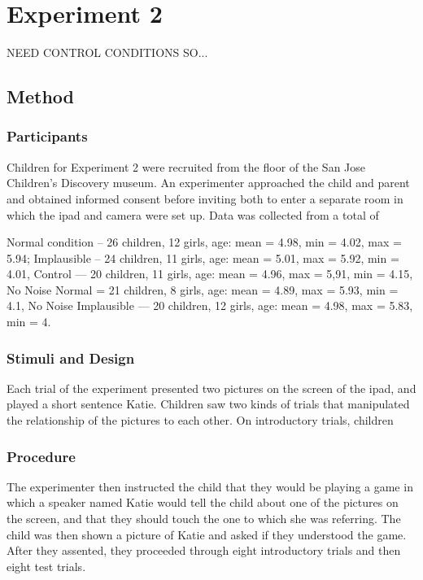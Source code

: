 \documentclass[man,floatsintext]{apa6}
\begin{document}
\section{Experiment 2}

NEED CONTROL CONDITIONS SO...

\subsection{Method}

\subsubsection{Participants}

Children for Experiment 2 were recruited from the floor of the San Jose Children's Discovery museum. An experimenter approached the child and parent and obtained informed consent before inviting both to enter a separate room in which the ipad and camera were set up. Data was collected from a total of 

 Normal condition -- 26 children, 12 girls, age: mean = 4.98, min = 4.02, max = 5.94; Implausible -- 24 children, 11 girls, age: mean = 5.01, max = 5.92, min = 4.01, Control --- 20 children, 11 girls, age: mean = 4.96, max = 5,91, min = 4.15, No Noise Normal = 21 children, 8 girls, age: mean = 4.89, max = 5.93, min = 4.1, No Noise Implausible --- 20 children, 12 girls, age: mean = 4.98, max = 5.83, min = 4. 
 
\subsubsection{Stimuli and Design}

Each trial of the experiment presented two pictures on the screen of the ipad, and played a short sentence Katie. Children saw two kinds of trials that manipulated the relationship of the pictures to each other. On introductory trials, children 

\subsubsection{Procedure}

The experimenter then instructed the child that they would be playing a game in which a speaker named Katie would tell the child about one of the pictures on the screen, and that they should touch the one to which she was referring. The child was then shown a picture of Katie and asked if they understood the game. After they assented, they proceeded through eight introductory trials and then eight test trials. 
\end{document}
